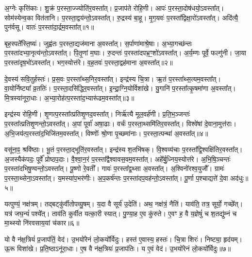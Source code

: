अ॒ग्नेः कृत्ति॑काः।
शु॒क्रं प॒रस्ता॒ज्ज्योति॑र॒वस्ता᳚त्।
प्र॒जा\-प॑ते रोहि॒णी।
आपः॑ प॒रस्ता॒दोष॑धयो॒\-ऽवस्ता᳚त्।
सोम॑स्येन्व॒का वित॑तानि।
प॒रस्ता॒द्वय॑न्तो॒\-ऽवस्ता᳚त्।
रु॒द्रस्य॑ बा॒हू।
मृ॒ग॒यवः॑ प॒रस्ता᳚द्विक्षा॒रो॑\-ऽवस्ता᳚त्।
अदि॑त्यै॒ पुन॑र्वसू।
वातः॑ प॒रस्ता॑दा॒र्द्रम॒वस्ता᳚त्॥१॥\ip

बृह॒स्पते᳚स्ति॒ष्यः॑।
जुह्व॑तः प॒रस्ता॒द्यज॑माना अ॒वस्ता᳚त्।
स॒र्पाणा॑माश्रे॒षाः।
अ॒भ्या॒गच्छ॑न्तः प॒रस्ता॑दभ्या॒नृत्य॑न्तो॒\-ऽवस्ता᳚त्।
पि॒तृ॒णां म॒घाः।
रु॒दन्तः॑ प॒रस्ता॑दपभ्र॒ꣳ॒शो॑\-ऽवस्ता᳚त्।
अ॒र्य॒म्णः पूर्वे॒ फल्गु॑नी।
जा॒या प॒रस्ता॑दृष॒भो॑\-ऽवस्ता᳚त्।
भग॒स्योत्त॑रे।
व॒ह॒तवः॑ प॒रस्ता॒द्वह॑माना अ॒वस्ता᳚त्॥२॥\ip

दे॒वस्य॑ सवि॒तुर्\mbox{}हस्तः॑।
प्र॒स॒वः प॒रस्ता᳚थ्स॒निर॒वस्ता᳚त्।
इन्द्र॑स्य चि॒त्रा।
ऋ॒तं प॒र\-स्ता᳚थ्\-स॒त्यम॒वस्ता᳚त्।
वा॒योर्निष्ट्या᳚ व्र॒ततिः॑।
प॒रस्ता॒दसि॑द्धिर॒वस्ता᳚त्।
इ॒न्द्रा॒ग्नि॒योर्विशा॑खे।
यु॒गानि॑ प॒रस्ता᳚त्कृ॒षमा॑णा अ॒वस्ता᳚त्।
मि॒त्रस्या॑नूरा॒धाः।
अ॒भ्या॒रोह॑त्प॒रस्ता॑\-द॒भ्यारू॑ढम॒वस्ता᳚त्॥३॥\ip

इन्द्र॑स्य रोहि॒णी।
शृ॒णत्प॒रस्ता᳚त्प्रतिशृ॒णद॒वस्ता᳚त्।
निर्\mbox{}ऋ॑त्यै मूल॒वर्\mbox{}ह॑णी।
प्र॒ति॒भ॒ञ्जन्तः॑ प॒रस्ता᳚त्प्रतिशृ॒णन्तो॒\-ऽवस्ता᳚त्।
अ॒पां पूर्वा॑ अषा॒ढाः।
वर्चः॑ प॒रस्ता॒थ्समि॑तिर॒वस्ता᳚त्।
विश्वे॑षां दे॒वाना॒मुत्त॑राः।
अ॒भि॒जय॑त्प॒रस्ता॑द॒भिजि॑तम॒वस्ता᳚त्।
विष्णोः᳚ श्रो॒णा पृ॒च्छमा॑नाः।
प॒रस्ता॒त्पन्था॑ अ॒वस्ता᳚त्॥४॥\ip

वसू॑ना॒ꣴ॒ श्रवि॑ष्ठाः।
भू॒तं प॒रस्ता॒द्भूति॑र॒वस्ता᳚त्।
इन्द्र॑स्य श॒तभि॑षक्।
वि॒श्वव्य॑चाः प॒रस्ता᳚द्वि॒श्वक्षि॑तिर॒वस्ता᳚त्।
अ॒जस्यैक॑पदः॒ पूर्वे᳚ प्रोष्ठप॒दाः।
वै॒श्वा॒न॒रं प॒रस्ता᳚द्वैश्वावस॒वम॒\-वस्ता᳚त्।
अहे᳚र्बु॒ध्निय॒स्यो\-त्त॑रे।
अ॒भि॒षि॒ञ्चन्तः॑ प॒रस्ता॑दभि\-षु॒ण्वन्तो॒\-ऽवस्ता᳚त्।
पू॒ष्णो रे॒वती᳚।
गावः॑ प॒रस्ता᳚द्व॒थ्सा अ॒वस्ता᳚त्।
अ॒श्विनो॑रश्व॒युजौ᳚।
ग्रामः॑ प॒रस्ता॒थ्सेना॒\-ऽवस्ता᳚त्।
य॒मस्या॑प॒भर॑णीः।
अ॒प॒कर्\mbox{}ष॑न्तः प॒रस्ता॑दप॒वह॑न्तो॒\-ऽवस्ता᳚त्।
पू॒र्णा प॒श्चाद्यत्ते॑ दे॒वा अद॑धुः॥५॥\ip\anuvakamend[आ॒र्द्रम॒वस्ता॒द्वह॑माना अ॒वस्ता॑द॒भ्यारू॑ढम॒वस्ता॒त्पन्था॑ अ॒वस्ता᳚द्व॒थ्सा अ॒वस्ता॒त्पञ्च॑ च]

यत्पुण्यं॒ नक्ष॑त्रम्।
तद्बट्कु॑र्वीतोपव्यु॒षम्।
य॒दा वै सूर्य॑ उ॒देति॑।
अथ॒ नक्ष॑त्रं॒ नैति॑।
याव॑ति॒ तत्र॒ सूर्यो॒ गच्छे᳚त्।
यत्र॑ जघ॒न्यं॑ पश्ये᳚त्।
ताव॑ति कुर्वीत यत्का॒री स्यात्।
पु॒ण्या॒ह ए॒व कु॑रुते।
ए॒वꣳ ह॒ वै य॒ज्ञेषुं॑ च श॒तद्यु॑म्नं च मा॒थ्स्यो नि॑रवसाय॒यां च॑कार॥६॥\ip

यो वै न॑क्ष॒त्रियं॑ प्र॒जा\-प॑तिं॒ वेद॑।
उ॒भयो॑रेनं लो॒कयो᳚र्विदुः।
हस्त॑ ए॒वास्य॒ हस्तः॑।
चि॒त्रा शिरः॑।
निष्ट्या॒ हृद॑यम्।
ऊ॒रू विशा॑खे।
प्र॒ति॒ष्ठा\-ऽनू॑रा॒धाः।
ए॒ष वै न॑क्ष॒त्रियः॑ प्र॒जा\-प॑तिः।
य ए॒वं वेद॑।
उ॒भयो॑रेनं लो॒कयो᳚र्विदुः॥७॥\ip

